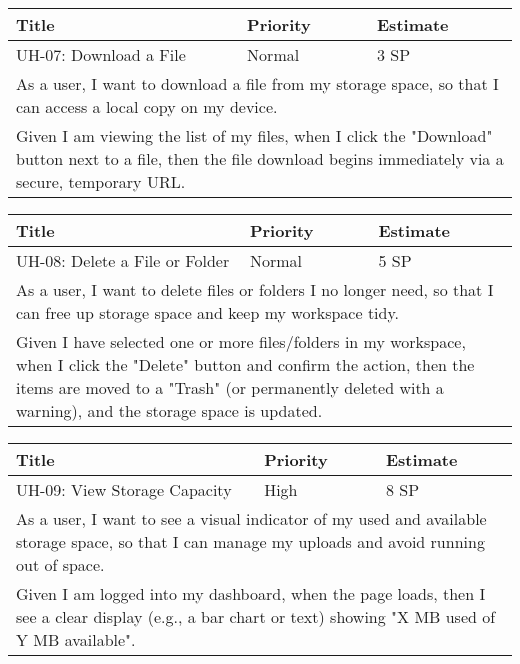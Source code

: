\vspace{5mm}
\begin{tabular}{|p{4cm}|p{5cm}|p{5cm}|}
    \hline
    \textbf{Title} & \textbf{Priority} & \textbf{Estimate} \\
    \hline
    UH-07: Download a File & Normal & 3 SP \\
    \hline
    \multicolumn{3}{|p{14cm}|}{As a user, I want to download a file from my storage space, so that I can access a local copy on my device.} \\
    \hline
    \multicolumn{3}{|p{14cm}|}{Given I am viewing the list of my files, when I click the "Download" button next to a file, then the file download begins immediately via a secure, temporary URL.} \\
    \hline
\end{tabular}

\vspace{5mm}
\begin{tabular}{|p{4cm}|p{5cm}|p{5cm}|}
    \hline
    \textbf{Title} & \textbf{Priority} & \textbf{Estimate} \\
    \hline
    UH-08: Delete a File or Folder & Normal & 5 SP \\
    \hline
    \multicolumn{3}{|p{14cm}|}{As a user, I want to delete files or folders I no longer need, so that I can free up storage space and keep my workspace tidy.} \\
    \hline
    \multicolumn{3}{|p{14cm}|}{Given I have selected one or more files/folders in my workspace, when I click the "Delete" button and confirm the action, then the items are moved to a "Trash" (or permanently deleted with a warning), and the storage space is updated.} \\
    \hline
\end{tabular}

\vspace{5mm}
\begin{tabular}{|p{4cm}|p{5cm}|p{5cm}|}
    \hline
    \textbf{Title} & \textbf{Priority} & \textbf{Estimate} \\
    \hline
    UH-09: View Storage Capacity & High & 8 SP \\
    \hline
    \multicolumn{3}{|p{14cm}|}{As a user, I want to see a visual indicator of my used and available storage space, so that I can manage my uploads and avoid running out of space.} \\
    \hline
    \multicolumn{3}{|p{14cm}|}{Given I am logged into my dashboard, when the page loads, then I see a clear display (e.g., a bar chart or text) showing "X MB used of Y MB available".} \\
    \hline
\end{tabular}

